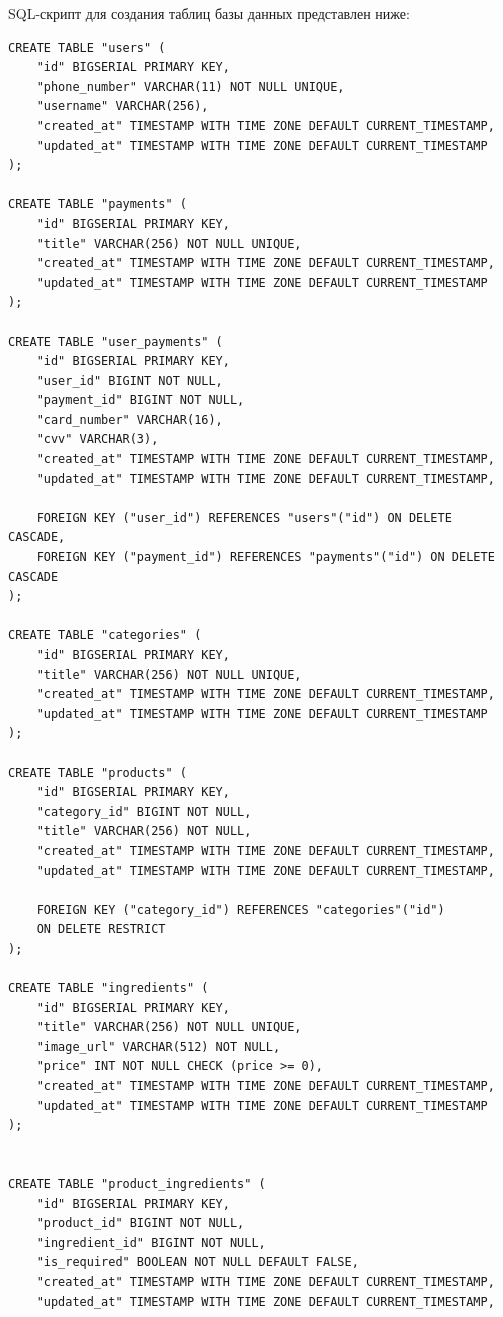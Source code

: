 \documentclass[a4paper,14pt]{extarticle}
\begin{document}
  SQL-скрипт для создания таблиц базы данных представлен ниже:

  \noindent
  \begin{Verbatim}[tabsize=4,fontsize=\small]
CREATE TABLE "users" (
    "id" BIGSERIAL PRIMARY KEY,
    "phone_number" VARCHAR(11) NOT NULL UNIQUE,
    "username" VARCHAR(256),
    "created_at" TIMESTAMP WITH TIME ZONE DEFAULT CURRENT_TIMESTAMP,
    "updated_at" TIMESTAMP WITH TIME ZONE DEFAULT CURRENT_TIMESTAMP
);

CREATE TABLE "payments" (
    "id" BIGSERIAL PRIMARY KEY,
    "title" VARCHAR(256) NOT NULL UNIQUE,
    "created_at" TIMESTAMP WITH TIME ZONE DEFAULT CURRENT_TIMESTAMP,
    "updated_at" TIMESTAMP WITH TIME ZONE DEFAULT CURRENT_TIMESTAMP
);

CREATE TABLE "user_payments" (
    "id" BIGSERIAL PRIMARY KEY,
    "user_id" BIGINT NOT NULL,
    "payment_id" BIGINT NOT NULL,
    "card_number" VARCHAR(16),
    "cvv" VARCHAR(3),
    "created_at" TIMESTAMP WITH TIME ZONE DEFAULT CURRENT_TIMESTAMP,
    "updated_at" TIMESTAMP WITH TIME ZONE DEFAULT CURRENT_TIMESTAMP,

    FOREIGN KEY ("user_id") REFERENCES "users"("id") ON DELETE CASCADE,
    FOREIGN KEY ("payment_id") REFERENCES "payments"("id") ON DELETE CASCADE
);

CREATE TABLE "categories" (
    "id" BIGSERIAL PRIMARY KEY,
    "title" VARCHAR(256) NOT NULL UNIQUE,
    "created_at" TIMESTAMP WITH TIME ZONE DEFAULT CURRENT_TIMESTAMP,
    "updated_at" TIMESTAMP WITH TIME ZONE DEFAULT CURRENT_TIMESTAMP
);

CREATE TABLE "products" (
    "id" BIGSERIAL PRIMARY KEY,
    "category_id" BIGINT NOT NULL,
    "title" VARCHAR(256) NOT NULL,
    "created_at" TIMESTAMP WITH TIME ZONE DEFAULT CURRENT_TIMESTAMP,
    "updated_at" TIMESTAMP WITH TIME ZONE DEFAULT CURRENT_TIMESTAMP,

    FOREIGN KEY ("category_id") REFERENCES "categories"("id")
    ON DELETE RESTRICT
);

CREATE TABLE "ingredients" (
    "id" BIGSERIAL PRIMARY KEY,
    "title" VARCHAR(256) NOT NULL UNIQUE,
    "image_url" VARCHAR(512) NOT NULL,
    "price" INT NOT NULL CHECK (price >= 0),
    "created_at" TIMESTAMP WITH TIME ZONE DEFAULT CURRENT_TIMESTAMP,
    "updated_at" TIMESTAMP WITH TIME ZONE DEFAULT CURRENT_TIMESTAMP
);


CREATE TABLE "product_ingredients" (
    "id" BIGSERIAL PRIMARY KEY,
    "product_id" BIGINT NOT NULL,
    "ingredient_id" BIGINT NOT NULL,
    "is_required" BOOLEAN NOT NULL DEFAULT FALSE,
    "created_at" TIMESTAMP WITH TIME ZONE DEFAULT CURRENT_TIMESTAMP,
    "updated_at" TIMESTAMP WITH TIME ZONE DEFAULT CURRENT_TIMESTAMP,


\end{Verbatim}
\end{document}
